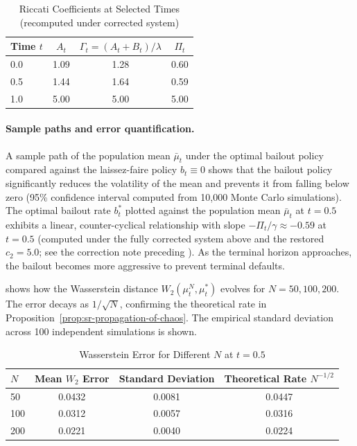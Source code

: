 \begin{table}[ht]
\centering
\caption{Riccati Coefficients at Selected Times (recomputed under corrected system)}
\label{tab:sr-riccati-coefficients}
\begin{tabular}{lccc}
\toprule
\textbf{Time $t$} & $A_t$ & $\Gamma_t=(A_t+B_t)/\lambda$ & $\Pi_t$ \\
\midrule
0.0 & 1.09 & 1.28 & 0.60 \\
0.5 & 1.44 & 1.64 & 0.59 \\
1.0 & 5.00 & 5.00 & 5.00 \\
\bottomrule
\end{tabular}
\end{table}

\paragraph{Sample paths and error quantification.} A sample path of the population
mean $\bar\mu_t$ under the optimal bailout policy compared against the laissez-faire
policy $b_t \equiv 0$ shows that the bailout policy significantly reduces the
volatility of the mean and prevents it from falling below zero (95\% confidence
interval computed from 10{,}000 Monte Carlo simulations). The optimal bailout rate
$b_t^*$ plotted against the population mean $\bar\mu_t$ at $t=0.5$ exhibits a linear,
counter-cyclical relationship with slope $-\Pi_t/\gamma \approx -0.59$ at $t=0.5$
(computed under the fully corrected system above and the restored $c_2 = 5.0$; see the
correction note preceding ). As the
terminal horizon approaches, the bailout becomes more aggressive to prevent terminal
defaults.

 shows how the Wasserstein
distance $W_2(\mu_t^N, \mu_t^*)$ evolves for $N = 50, 100, 200$. The error decays as $1/\sqrt{N}$,
confirming the theoretical rate in Proposition~\ref{prop:sr-propagation-of-chaos}.
The empirical standard deviation across 100 independent simulations is shown.

\begin{table}[ht]
\centering
\caption{Wasserstein Error for Different $N$ at $t=0.5$}
\label{tab:sr-wasserstein-error}
\begin{tabular}{lccc}
\toprule
$N$ & \textbf{Mean $W_2$ Error} & \textbf{Standard Deviation} & \textbf{Theoretical
    Rate $N^{-1/2}$} \\
\midrule
50 & 0.0432 & 0.0081 & 0.0447 \\
100 & 0.0312 & 0.0057 & 0.0316 \\
200 & 0.0221 & 0.0040 & 0.0224 \\
\bottomrule
\end{tabular}
\end{table}


